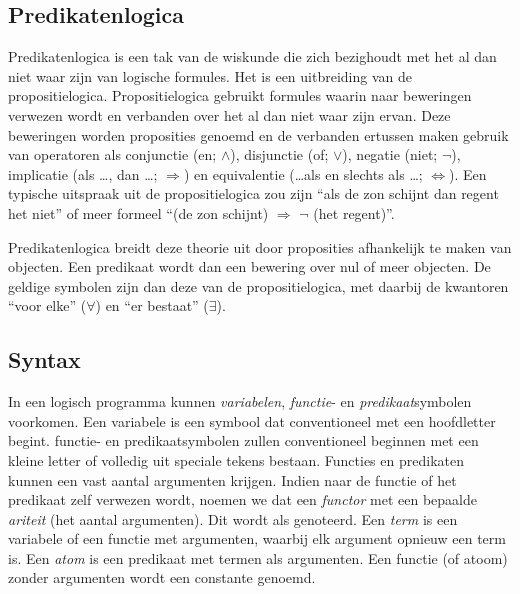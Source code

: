 \subsection{Predikatenlogica}

Predikatenlogica is een tak van de wiskunde die zich bezighoudt met het al dan niet waar zijn van logische formules. Het is een uitbreiding van de propositielogica. Propositielogica gebruikt formules waarin naar beweringen verwezen wordt en verbanden over het al dan niet waar zijn ervan. Deze beweringen worden proposities genoemd en de verbanden ertussen maken gebruik van operatoren als conjunctie (en; $\land$), disjunctie (of; $\lor$), negatie (niet; $\lnot$), implicatie (als \ldots, dan \ldots; $\Rightarrow$) en equivalentie (\ldots als en slechts als \ldots; $\Leftrightarrow$). Een typische uitspraak uit de propositielogica zou zijn ``als de zon schijnt dan regent het niet'' of meer formeel ``(de zon schijnt) $\Rightarrow$ $\lnot$ (het regent)''.

Predikatenlogica breidt deze theorie uit door proposities afhankelijk te maken van objecten. Een predikaat wordt dan een bewering over nul of meer objecten. De geldige symbolen zijn dan deze van de propositielogica, met daarbij de kwantoren ``voor elke'' ($\forall$) en ``er bestaat'' ($\exists$).

\subsection{Syntax}

In een logisch programma kunnen {\em variabelen}, {\em functie}- en {\em predikaat}symbolen voorkomen. Een variabele is een symbool dat conventioneel met een hoofdletter begint. functie- en predikaatsymbolen zullen conventioneel beginnen met een kleine letter of volledig uit speciale tekens bestaan. Functies en predikaten kunnen een vast aantal argumenten krijgen. Indien naar de functie of het predikaat zelf verwezen wordt, noemen we dat een {\em functor} met een bepaalde {\em ariteit} (het aantal argumenten). Dit wordt als  genoteerd. Een {\em term} is een variabele of een functie met argumenten, waarbij elk argument opnieuw een term is. Een {\em atom} is een predikaat met termen als argumenten. Een functie (of atoom) zonder argumenten wordt een constante genoemd.

